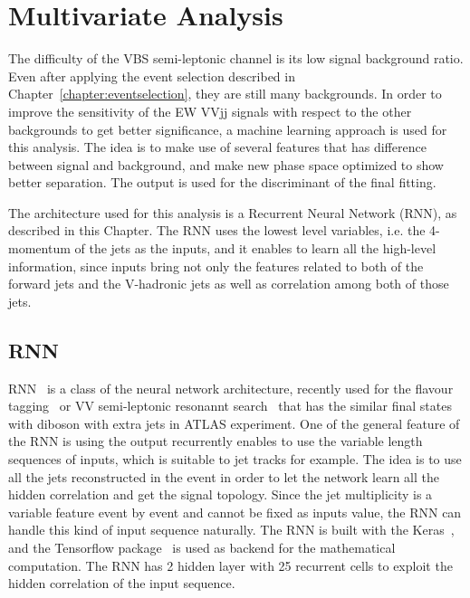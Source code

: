 \chapter{Multivariate Analysis}
\label{chap:MVA}

The difficulty of the VBS semi-leptonic channel is its low signal background ratio. Even after applying the event selection described in Chapter~\ref{chapter:eventselection}, they are still many backgrounds. In order to improve the sensitivity of the EW VVjj signals with respect to the other backgrounds to get better significance, a machine learning approach is used for this analysis.
The idea is to make use of several features that has difference between signal and background, and make new phase space optimized to show better separation. The output is used for the discriminant of the final fitting.

The architecture used for this analysis is a Recurrent Neural Network (RNN), as described in this Chapter.
The RNN uses the lowest level variables, i.e. the 4-momentum of the jets as the inputs, and it enables to learn all the high-level information, since inputs bring not only the features related to both of the forward jets and the V-hadronic jets as well as correlation among both of those jets.

\section{RNN}
RNN~\cite{Sherstinsky_2020} is a class of the neural network architecture, recently used for the flavour tagging~\cite{ATL-PHYS-PUB-2017-003} or VV semi-leptonic resonannt search~\cite{HDBS-2018-10} that has the similar final states with diboson  with extra jets in ATLAS experiment.
One of the general feature of the RNN is using the output recurrently enables to use the variable length sequences of inputs, which is suitable to jet tracks for example.
The idea is to use all the jets reconstructed in the event in order to let the network learn all the hidden correlation and get the signal topology.
Since the jet multiplicity is a variable feature event by event and cannot be fixed as inputs value, the RNN can handle this kind of input sequence naturally.
The RNN is built with the Keras~\cite{chollet2015keras}, and the Tensorflow package~\cite{tensorflow2015-whitepaper} is used as backend for the mathematical computation. The RNN has 2 hidden layer with 25 recurrent cells to exploit the hidden correlation of the input sequence. %

